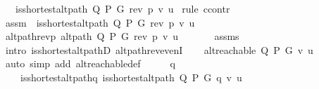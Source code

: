\begin{isabellebody}
\ \ \ {\isachardoublequoteopen}is{\isacharunderscore}{\kern0pt}shortest{\isacharunderscore}{\kern0pt}alt{\isacharunderscore}{\kern0pt}path\ Q\ P\ G\ {\isacharparenleft}{\kern0pt}rev\ p{\isacharparenright}{\kern0pt}\ v\ u{\isachardoublequoteclose}%
\endisataginvisible
{\isafoldinvisible}%
%
\isadeliminvisible
\isanewline
%
\endisadeliminvisible
%
\isadelimproof
%
\endisadelimproof
%
\isatagproof
{}\isamarkupfalse%
\ {\isacharparenleft}{\kern0pt}rule\ ccontr{\isacharparenright}{\kern0pt}\isanewline
\ \ \isamarkupfalse%
\ assm{\isacharcolon}{\kern0pt}\ {\isachardoublequoteopen}{\isasymnot}\ is{\isacharunderscore}{\kern0pt}shortest{\isacharunderscore}{\kern0pt}alt{\isacharunderscore}{\kern0pt}path\ Q\ P\ G\ {\isacharparenleft}{\kern0pt}rev\ p{\isacharparenright}{\kern0pt}\ v\ u{\isachardoublequoteclose}\isanewline
\ \ \isamarkupfalse%
\ alt{\isacharunderscore}{\kern0pt}path{\isacharunderscore}{\kern0pt}rev{\isacharunderscore}{\kern0pt}p{\isacharcolon}{\kern0pt}\ {\isachardoublequoteopen}alt{\isacharunderscore}{\kern0pt}path\ Q\ P\ G\ {\isacharparenleft}{\kern0pt}rev\ p{\isacharparenright}{\kern0pt}\ v\ u\ {\isachardoublequoteclose}\isanewline
\ \ \ \ \isamarkupfalse%
\ assms{\isacharparenleft}{\kern0pt}{}{\isacharcomma}{\kern0pt}\ {}{\isacharparenright}{\kern0pt}\isanewline
\ \ \ \ \isamarkupfalse%
\ {\isacharparenleft}{\kern0pt}intro\ is{\isacharunderscore}{\kern0pt}shortest{\isacharunderscore}{\kern0pt}alt{\isacharunderscore}{\kern0pt}pathD{\isacharparenleft}{\kern0pt}{}{\isacharparenright}{\kern0pt}\ alt{\isacharunderscore}{\kern0pt}path{\isacharunderscore}{\kern0pt}rev{\isacharunderscore}{\kern0pt}evenI{\isacharparenright}{\kern0pt}\isanewline
\ \ \isamarkupfalse%
\ {\isachardoublequoteopen}alt{\isacharunderscore}{\kern0pt}reachable\ Q\ P\ G\ v\ u{\isachardoublequoteclose}\isanewline
\ \ \ \ \isamarkupfalse%
\ {\isacharparenleft}{\kern0pt}auto\ simp\ add{\isacharcolon}{\kern0pt}\ alt{\isacharunderscore}{\kern0pt}reachable{\isacharunderscore}{\kern0pt}def{\isacharparenright}{\kern0pt}\isanewline
\ \ \isamarkupfalse%
\ \isamarkupfalse%
\ q\ \isanewline
\ \ \ \ is{\isacharunderscore}{\kern0pt}shortest{\isacharunderscore}{\kern0pt}alt{\isacharunderscore}{\kern0pt}path{\isacharunderscore}{\kern0pt}q{\isacharcolon}{\kern0pt}\ {\isachardoublequoteopen}is{\isacharunderscore}{\kern0pt}shortest{\isacharunderscore}{\kern0pt}alt{\isacharunderscore}{\kern0pt}path\ Q\ P\ G\ q\ v\ u{\isachardoublequoteclose}\isanewline

\end{isabellebody}
